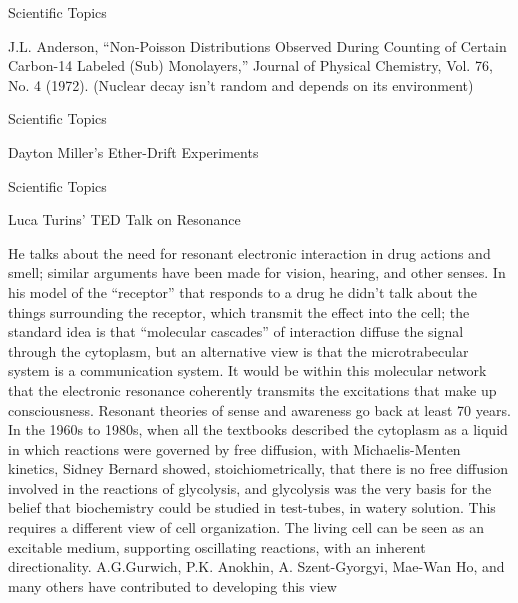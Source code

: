 \documentclass[11pt,oneside,openany,extrafontsizes]{memoir}
\begin{document}
\begin{standalonequote}{Scientific Topics}

    \begin{answer}
        J.L. Anderson, \enquote{Non-Poisson Distributions Observed During Counting of Certain Carbon-14 Labeled (Sub) Monolayers,} Journal of Physical Chemistry, Vol. 76, No. 4 (1972). (Nuclear decay isn't random and depends on its environment)
    \end{answer}
\end{standalonequote}

\begin{standalonequote}{Scientific Topics}

    \begin{answer}
        Dayton Miller's Ether-Drift Experiments
    \end{answer}
\end{standalonequote}

\begin{standalonequote}{Scientific Topics}
    \begin{note}
        Luca Turins' TED Talk on Resonance
    \end{note}

    \begin{answer}
        He talks about the need for resonant electronic interaction in drug actions and smell; similar arguments have been made for vision, hearing, and other senses. In his model of the \enquote{receptor} that responds to a drug he didn't talk about the things surrounding the receptor, which transmit the effect into the cell; the standard idea is that \enquote{molecular cascades} of interaction diffuse the signal through the cytoplasm, but an alternative view is that the microtrabecular system is a communication system. It would be within this molecular network that the electronic resonance coherently transmits the excitations that make up consciousness. Resonant theories of sense and awareness go back at least 70 years. In the 1960s to 1980s, when all the textbooks described the cytoplasm as a liquid in which reactions were governed by free diffusion, with Michaelis-Menten kinetics, Sidney Bernard showed, stoichiometrically, that there is no free diffusion involved in the reactions of glycolysis, and glycolysis was the very basis for the belief that biochemistry could be studied in test-tubes, in watery solution. This requires a different view of cell organization. The living cell can be seen as an excitable medium, supporting oscillating reactions, with an inherent directionality. A.G.Gurwich, P.K. Anokhin, A. Szent-Gyorgyi, Mae-Wan Ho, and many others have contributed to developing this view
    \end{answer}
\end{standalonequote}
\end{document}
